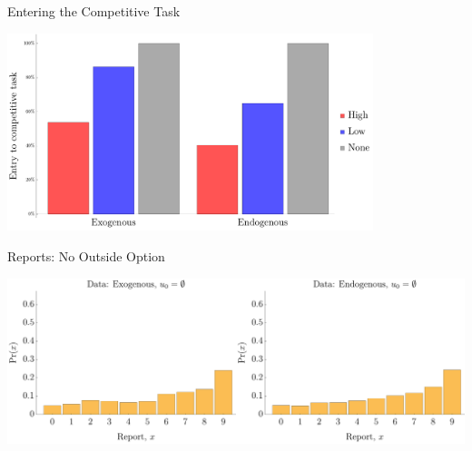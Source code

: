 \documentclass{beamer}
\begin{document}
\begin{frame}{Entering the Competitive Task}
    \begin{center}
        \includegraphics[width=0.8\textwidth]{./ih/col_TaskEntry.pdf}
    \end{center}
\end{frame}

\begin{frame}{Reports: No Outside Option}
    \begin{center}
        \includegraphics[width=0.5\textwidth]{./ih/emp_hist_ex_none.pdf}\includegraphics[width=0.5\textwidth]{./ih/emp_hist_en_none.pdf}
    \end{center}
\end{frame}
\end{document}
